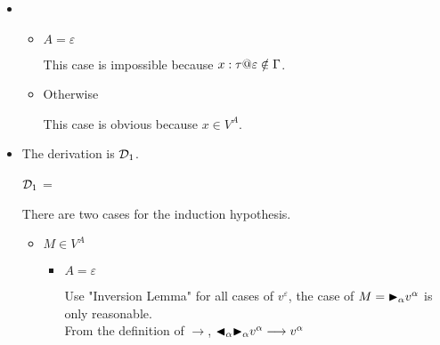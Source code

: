 \begin{itemize}
	\item \TVar
	      \begin{itemize}
	      	\item $ A = \varepsilon$
	      	      	      	      	      	      	      	      	      	      	      	      		      	      	      	      	      	      	      	      
	      	      This case is impossible because $x:\tau@\varepsilon \notin \G$.
	      	\item Otherwise
	      	      	      	      	      	      	      	      	      	      	      	      		      	      	      	      	      	      	      	      
	      	      This case is obvious because $x \in V^A$.
	      \end{itemize}
	      	      	      	      	      	      		      	      	      	      
	\item \TTBL
	      	      	      	      	      	      		      	      	      	      
	      The derivation is $\mathcal{D}_1$.
	      	      	      	      	      	      		      	      	      	      
	      $\mathcal{D}_1$ = 
	      {}
	      	      	      	      	      	      		      	      	      	      
	      There are two cases for the induction hypothesis.
	      	      	      	      	      	      		      	      	      	      
	      \begin{itemize}
	      		      		      		      		      		      			      		      		      		      	
	      	\item $ M \in V^A $
	      	      	      	      	      	      	      	      	      	      	      	      		      	      	      	      	      	      	      	      
	      	      \begin{itemize}
	      	      	\item $ A = \varepsilon $
	      	      	      	      	      	      	      	      	      	      	      	      	      	      	      	      	      	      		      	      	      	      	      	      	      	      	      	      	      	      
	      	      	      Use "Inversion Lemma" for all cases of $v^\varepsilon$, the case of $ M = {\mathop{\blacktriangleright}}_\alpha v^\alpha $ is only reasonable.\\
	      	      	      From the definition of $ \longrightarrow $, ${\mathop{\blacktriangleleft}}_\alpha {\mathop{\blacktriangleright}}_\alpha v^\alpha \longrightarrow v^\alpha$
	      	      	      	      	      	      	      	      	      	      	      	      	      	      	      	      	      	      		      	      	      	      	      	      	      	      	      	      	      	      

\end{itemize}
\end{itemize}
\end{itemize}
